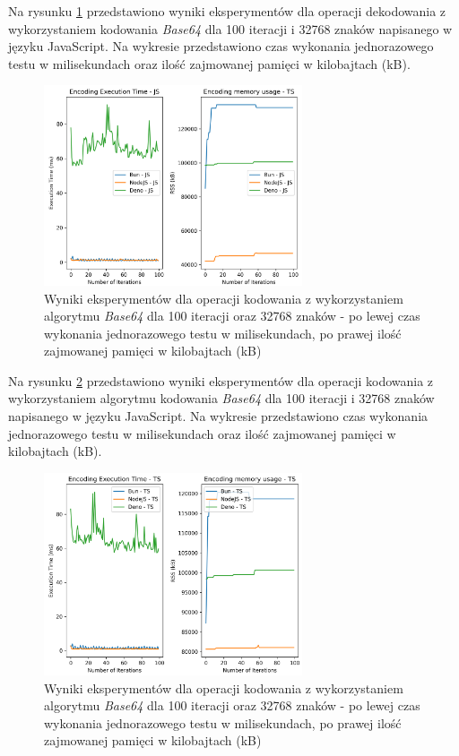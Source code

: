 Na rysunku \ref{fig:decoding_e1_js} przedstawiono wyniki eksperymentów dla operacji dekodowania z wykorzystaniem kodowania \textit{Base64} dla 100 iteracji i 32768 znaków napisanego w języku JavaScript. Na wykresie przedstawiono czas wykonania jednorazowego testu w milisekundach oraz ilość zajmowanej pamięci w kilobajtach (kB).

\begin{figure}[H]
  \centering
  \includegraphics[width=0.68\textwidth]{Figures/coding/base64_100_encoding_js.png}
  \caption{Wyniki eksperymentów dla operacji kodowania z wykorzystaniem algorytmu \textit{Base64} dla 100 iteracji oraz 32768 znaków - po lewej czas wykonania jednorazowego testu w milisekundach, po prawej ilość zajmowanej pamięci w kilobajtach (kB)}
  \label{fig:decoding_e1_js}
\end{figure}

Na rysunku \ref{fig:encoding_e1_ts} przedstawiono wyniki eksperymentów dla operacji kodowania z wykorzystaniem algorytmu kodowania \textit{Base64} dla 100 iteracji i 32768 znaków napisanego w języku JavaScript. Na wykresie przedstawiono czas wykonania jednorazowego testu w milisekundach oraz ilość zajmowanej pamięci w kilobajtach (kB).

\begin{figure}[H]
  \centering
  \includegraphics[width=0.68\textwidth]{Figures/coding/base64_100_encoding_ts.png}
  \caption{Wyniki eksperymentów dla operacji kodowania z wykorzystaniem algorytmu \textit{Base64} dla 100 iteracji oraz 32768 znaków - po lewej czas wykonania jednorazowego testu w milisekundach, po prawej ilość zajmowanej pamięci w kilobajtach (kB)}
  \label{fig:encoding_e1_ts}
\end{figure}


